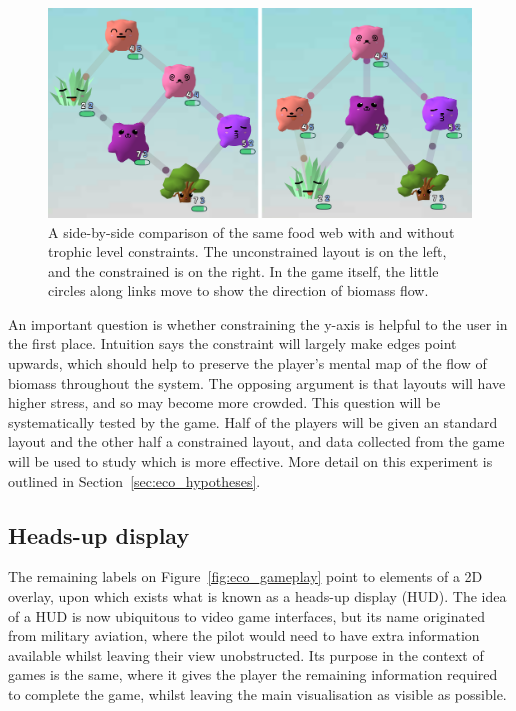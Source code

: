 \begin{figure}
    \centering
    \includegraphics[width=\textwidth]{joy/trophic.png}
    \caption[A side-by-side comparison of trophic level constraints]{A side-by-side comparison of the same food web with and without trophic level constraints. The unconstrained layout is on the left, and the constrained is on the right. In the game itself, the little circles along links move to show the direction of biomass flow.}
    \label{fig:trophic}
\end{figure}

An important question is whether constraining the y-axis is helpful to the user in the first place. Intuition says the constraint will largely make edges point upwards, which should help to preserve the player's mental map of the flow of biomass throughout the system. The opposing argument is that layouts will have higher stress, and so may become more crowded.
This question will be systematically tested by the game. Half of the players will be given an standard layout and the other half a constrained layout, and data collected from the game will be used to study which is more effective. More detail on this experiment is outlined in Section~\ref{sec:eco_hypotheses}.

\subsection{Heads-up display}
\label{sec:HUD}
The remaining labels on Figure~\ref{fig:eco_gameplay} point to elements of a 2D overlay, upon which exists what is known as a heads-up display (HUD). The idea of a HUD is now ubiquitous to video game interfaces, but its name originated from military aviation, where the pilot would need to have extra information available whilst leaving their view unobstructed. 
Its purpose in the context of games is the same, where it gives the player the remaining information required to complete the game, whilst leaving the main visualisation as visible as possible.

